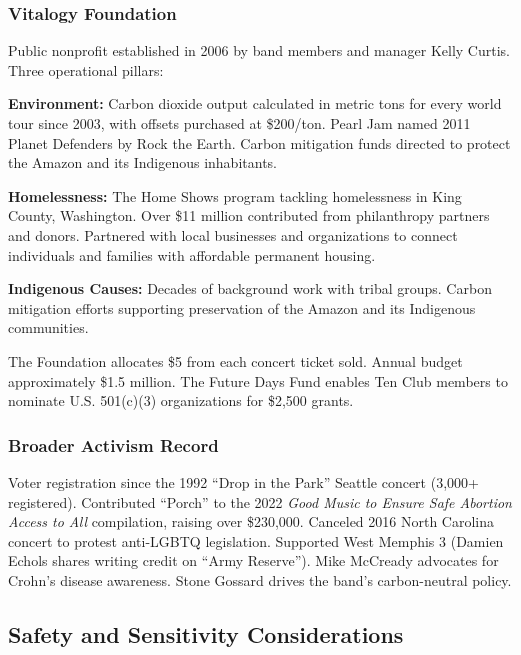 \documentclass[11pt,letterpaper]{article}
\begin{document}
\subsubsection{Vitalogy Foundation}

Public nonprofit established in 2006 by band members and manager Kelly Curtis. Three operational pillars:

\textbf{Environment:} Carbon dioxide output calculated in metric tons for every world tour since 2003, with offsets purchased at \$200/ton. Pearl Jam named 2011 Planet Defenders by Rock the Earth. Carbon mitigation funds directed to protect the Amazon and its Indigenous inhabitants.

\textbf{Homelessness:} The Home Shows program tackling homelessness in King County, Washington. Over \$11 million contributed from philanthropy partners and donors. Partnered with local businesses and organizations to connect individuals and families with affordable permanent housing.

\textbf{Indigenous Causes:} Decades of background work with tribal groups. Carbon mitigation efforts supporting preservation of the Amazon and its Indigenous communities.

The Foundation allocates \$5 from each concert ticket sold. Annual budget approximately \$1.5 million. The Future Days Fund enables Ten Club members to nominate U.S. 501(c)(3) organizations for \$2,500 grants.

\subsubsection{Broader Activism Record}

Voter registration since the 1992 ``Drop in the Park'' Seattle concert (3,000+ registered). Contributed ``Porch'' to the 2022 \textit{Good Music to Ensure Safe Abortion Access to All} compilation, raising over \$230,000. Canceled 2016 North Carolina concert to protest anti-LGBTQ legislation. Supported West Memphis 3 (Damien Echols shares writing credit on ``Army Reserve''). Mike McCready advocates for Crohn's disease awareness. Stone Gossard drives the band's carbon-neutral policy.

\subsection{Safety and Sensitivity Considerations}
\end{document}
